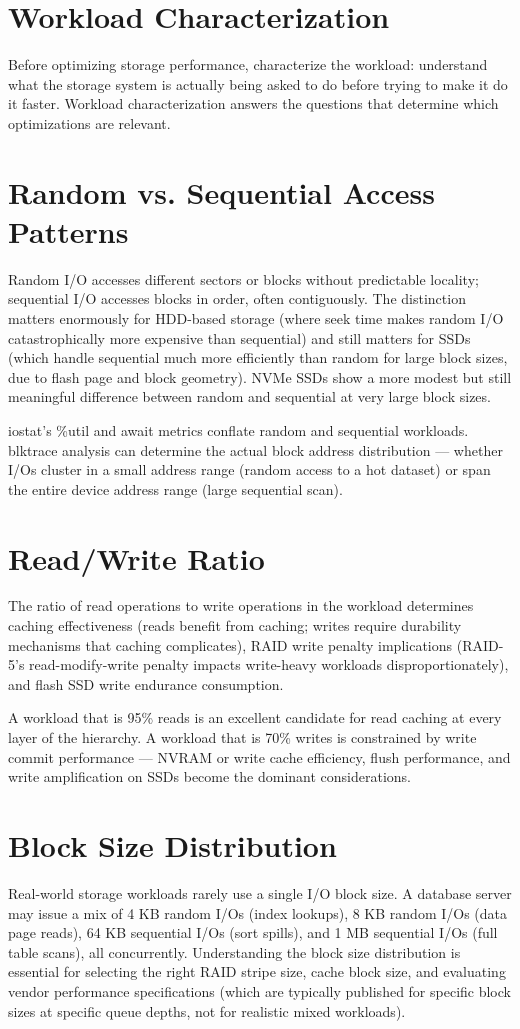 \section{Workload Characterization}
Before optimizing storage performance, characterize the workload: understand what the storage system is actually being asked to do before trying to make it do it faster. Workload characterization answers the questions that determine which optimizations are relevant.

\section{Random vs. Sequential Access Patterns}
Random I/O accesses different sectors or blocks without predictable locality; sequential I/O accesses blocks in order, often contiguously. The distinction matters enormously for HDD-based storage (where seek time makes random I/O catastrophically more expensive than sequential) and still matters for SSDs (which handle sequential much more efficiently than random for large block sizes, due to flash page and block geometry). NVMe SSDs show a more modest but still meaningful difference between random and sequential at very large block sizes.

iostat's \%util and await metrics conflate random and sequential workloads. blktrace analysis can determine the actual block address distribution --- whether I/Os cluster in a small address range (random access to a hot dataset) or span the entire device address range (large sequential scan).

\section{Read/Write Ratio}
The ratio of read operations to write operations in the workload determines caching effectiveness (reads benefit from caching; writes require durability mechanisms that caching complicates), RAID write penalty implications (RAID-5's read-modify-write penalty impacts write-heavy workloads disproportionately), and flash SSD write endurance consumption.

A workload that is 95\% reads is an excellent candidate for read caching at every layer of the hierarchy. A workload that is 70\% writes is constrained by write commit performance --- NVRAM or write cache efficiency, flush performance, and write amplification on SSDs become the dominant considerations.

\section{Block Size Distribution}
Real-world storage workloads rarely use a single I/O block size. A database server may issue a mix of 4 KB random I/Os (index lookups), 8 KB random I/Os (data page reads), 64 KB sequential I/Os (sort spills), and 1 MB sequential I/Os (full table scans), all concurrently. Understanding the block size distribution is essential for selecting the right RAID stripe size, cache block size, and evaluating vendor performance specifications (which are typically published for specific block sizes at specific queue depths, not for realistic mixed workloads).

